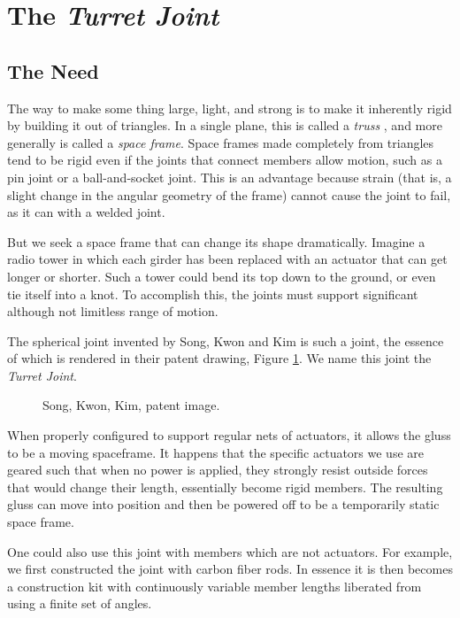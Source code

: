 \documentclass[11pt]{article}
\begin{document}
\section{The \textit{Turret Joint}}

\subsection{The Need}

The way to make some thing large, light, and strong is to make it inherently rigid by building it
out of triangles. In a single plane, this is called a \emph{truss} \cite{ambrose1993building}, and more generally is called
a \emph{space frame}.  Space frames made completely from triangles tend to be rigid even if the
joints that connect members allow motion, such as a pin joint or a ball-and-socket joint. This
is an advantage because strain (that is, a slight change in the angular geometry of the frame) cannot cause
the joint to fail, as it can with a welded joint.

But we seek a space frame that can change its shape dramatically. Imagine a radio tower in which
each girder has been replaced with an actuator that can get longer or shorter. Such a tower could
bend its top down to the ground, or even
tie itself into a knot. To accomplish this, the joints must support significant although not
limitless range of motion. 

The spherical joint invented by Song, Kwon and Kim \cite{song2003spherical} is such a joint,
the essence of which is rendered in their patent drawing, Figure \ref{SongKwonKimImage}.
We name this joint the \emph{Turret Joint}.

\begin{figure}[!ht]
  \centering
    \caption[Song, Kwon, Kim, patent image.]{Song, Kwon, Kim, patent image.}
      \label{SongKwonKimImage}
\end{figure}

When properly configured to support regular nets of actuators,
it allows the gluss to be a moving spaceframe. It happens that the specific actuators we use
are geared such that when no power is applied, they strongly resist outside forces that would change their length,
essentially become rigid members.
The resulting gluss
can move into position and then be powered off to be a temporarily static space frame.

One could also use this joint with members which are not actuators. For example, we first
constructed the joint with carbon fiber rods. In essence it is then becomes a construction kit with continuously
variable member lengths liberated from using a finite set of angles.
\end{document}
